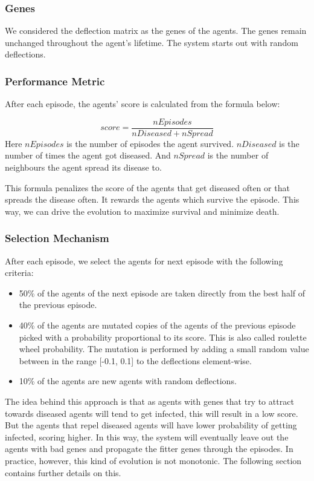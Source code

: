 \documentclass[a4paper,11pt]{article}
\begin{document}
    \subsubsection{Genes}
    We considered the deflection matrix as the genes of the agents. The genes remain unchanged throughout the agent’s lifetime. The system starts out with random deflections.

    \subsubsection{Performance Metric}
    After each episode, the agents’ score is calculated from the formula below:

    \begin{equation}
        score = \frac{nEpisodes}{nDiseased + nSpread}
    \end{equation}
    Here $nEpisodes$ is the number of episodes the agent survived.
    $nDiseased$ is the number of times the agent got diseased.
    And $nSpread$ is the number of neighbours the agent spread its disease to.

    This formula penalizes the score of the agents that get diseased often or that spreads the disease often. It rewards the agents which survive the episode. This way, we can drive the evolution to maximize survival and minimize death.

    \subsubsection{Selection Mechanism}
    After each episode, we select the agents for next episode with the following criteria:

    \begin{itemize}
        \item 50\% of the agents of the next episode are taken directly from the best half of the previous episode.
        \item 40\% of the agents are mutated copies of the agents of the previous episode picked with a probability proportional to its score. This is also called roulette wheel probability. The mutation is performed by adding a small random value between in the range [-0.1, 0.1] to the deflections element-wise.
        \item 10\% of the agents are new agents with random deflections.
    \end{itemize}

    The idea behind this approach is that as agents with genes that try to attract towards diseased agents will tend to get infected, this will result in a low score. But the agents that repel diseased agents will have lower probability of getting infected, scoring higher. In this way, the system will eventually leave out the agents with bad genes and propagate the fitter genes through the episodes. In practice, however, this kind of evolution is not monotonic. The following section contains further details on this.
\end{document}
